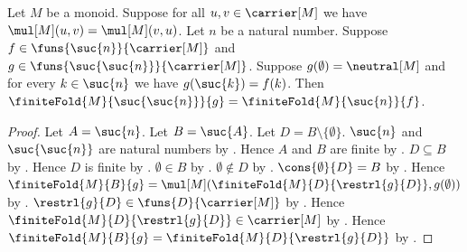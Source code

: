 \begin{theorem}\label{monoid_finite_fold_successor_shift}
    Let $M$ be a monoid.
    Suppose for all $u,v\in\carrier[M]$ we have
        $\mul[M](u,v)=\mul[M](v,u)$.
    Let $n$ be a natural number.
    Suppose $f\in\funs{\suc{n}}{\carrier[M]}$ and
        $g\in\funs{\suc{\suc{n}}}{\carrier[M]}$.
    Suppose $g(\emptyset)=\neutral[M]$ and for every $k\in\suc{n}$
        we have $g(\suc{k})=f(k)$.
    Then
        $\finiteFold{M}{\suc{\suc{n}}}{g}
            =\finiteFold{M}{\suc{n}}{f}$.
\end{theorem}
\begin{proof}
    Let $A=\suc{n}$.
    Let $B=\suc{A}$.
    Let $D=B\setminus\{\emptyset\}$.
    $\suc{n}$ and $\suc{\suc{n}}$ are natural numbers by
        .
    Hence $A$ and $B$ are finite by
        .
    $D\subseteq B$ by .
    Hence $D$ is finite by .
    $\emptyset\in B$ by
        .
    $\emptyset\notin D$ by
        .
    $\cons{\emptyset}{D}=B$ by
        .
    Hence
        $\finiteFold{M}{B}{g}
            =\mul[M](
                \finiteFold{M}{D}{\restrl{g}{D}},g(\emptyset))$ by
        .
    $\restrl{g}{D}\in\funs{D}{\carrier[M]}$ by
        .
    Hence $\finiteFold{M}{D}{\restrl{g}{D}}\in\carrier[M]$ by
        .
    Hence
        $\finiteFold{M}{B}{g}
            =\finiteFold{M}{D}{\restrl{g}{D}}$ by
        .


\end{proof}
